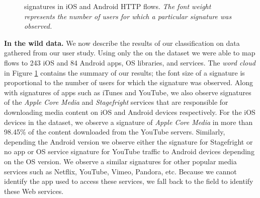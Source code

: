 \begin{figure}
\newline
{}
\caption{\useragent signatures in  iOS and Android HTTP flows. \emph{The font weight represents the number of users for which a particular signature was observed.}}
\vspace{\postfigspace}
\label{fig:http-wordcloud}
\end{figure}

\textbf{In the wild data.}
We now describe the results of our classification on data gathered from our user study.
Using only the \useragent on the \mobWild dataset we were able to map flows to 243 iOS and 84 Android apps, OS libraries, and services. 
The \emph{word cloud} in Figure \ref{fig:http-wordcloud} contains the summary of our results; the font size of a signature is proportional to the number of users for which the signature was observed.
Along with signatures of apps such as iTunes and YouTube, we also observe signatures of the \emph{Apple Core Media} and \emph{Stagefright} services that are responsible for downloading media content on iOS and Android devices respectively.
For the iOS devices in the \mobWild dataset, we observe a signature of \emph{Apple Core Media} in more than 98.45\% of the content downloaded from the YouTube servers.
Similarly, depending the Android version we observe either the signature for Stagefright or no app or OS service signature for YouTube traffic to Android devices depending on the OS version. 
We observe a similar signatures for other popular media services such as Netflix, YouTube, Vimeo, Pandora, etc.
Because we cannot identify the app used to access these services, we fall back to the \httphost field to identify these Web services.

